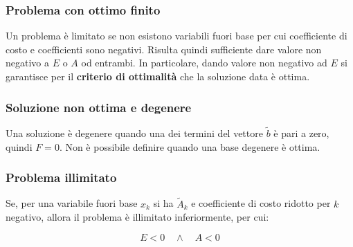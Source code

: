 \documentclass[\main/main.tex]{subfiles}
\begin{document}
\subsubsection*{Problema con ottimo finito}
Un problema è limitato se non esistono variabili fuori base per cui coefficiente di costo e coefficienti sono negativi. Risulta quindi sufficiente dare valore non negativo a $E$ o $A$ od entrambi. In particolare, dando valore non negativo ad $E$ si garantisce per il \textbf{criterio di ottimalità} che la soluzione data è ottima.

\subsubsection*{Soluzione non ottima e degenere}
Una soluzione è degenere quando una dei termini del vettore $\tilde{b}$ è pari a zero, quindi $F = 0$. Non è possibile definire quando una base degenere è ottima.

\subsubsection*{Problema illimitato}
Se, per una variabile fuori base $x_k$ si ha $\tilde{A}_k$ e coefficiente di costo ridotto per $k$ negativo, allora il problema è illimitato inferiormente, per cui:

\[
  E < 0 \quad \land \quad A < 0
\]
\end{document}
